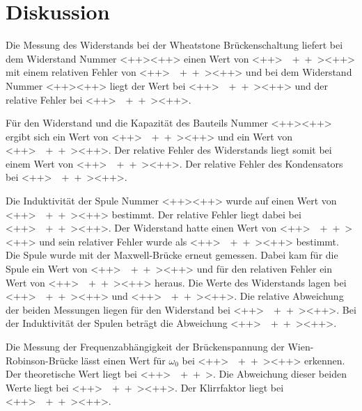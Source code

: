 \section{Diskussion}
\label{sec:Diskussion}

Die Messung des Widerstands bei der Wheatstone Brückenschaltung liefert bei dem Widerstand Nummer \num{<++>}<++> 
einen Wert von \SI{<++>}{\<++>}<++> mit einem relativen Fehler von \SI{<++>}{\<++>}<++> und bei dem Widerstand Nummer 
\num{<++>}<++> liegt der Wert bei \SI{<++>}{\<++>}<++> und der relative Fehler bei \SI{<++>}{\<++>}<++>. 

\noindent Für den Widerstand und die Kapazität des Bauteils Nummer \num{<++>}<++> ergibt sich ein Wert von 
\SI{<++>}{\<++>}<++> und ein Wert von \SI{<++>}{\<++>}<++>. Der relative Fehler des Widerstands liegt somit bei einem 
Wert von \SI{<++>}{\<++>}<++>. Der relative Fehler des Kondensators bei \SI{<++>}{\<++>}<++>. 

\noindent Die Induktivität der Spule Nummer \num{<++>}<++> wurde auf einen Wert von \SI{<++>}{\<++>}<++> bestimmt. 
Der relative Fehler liegt dabei bei \SI{<++>}{\<++>}<++>. Der Widerstand hatte einen Wert von \SI{<++>}{\<++>}<++> 
und sein relativer Fehler wurde als \SI{<++>}{\<++>}<++> bestimmt. 
Die Spule wurde mit der Maxwell-Brücke erneut gemessen. Dabei kam für die Spule ein Wert von \SI{<++>}{\<++>}<++> 
und für den relativen Fehler ein Wert von \SI{<++>}{\<++>}<++> heraus. Die Werte des Widerstands lagen bei 
\SI{<++>}{\<++>}<++> und \SI{<++>}{\<++>}<++>. Die relative Abweichung der beiden Messungen liegen für den Widerstand 
bei \SI{<++>}{\<++>}<++>. Bei der Induktivität der Spulen beträgt die Abweichung \SI{<++>}{\<++>}<++>. 

\noindent Die Messung der Frequenzabhängigkeit der Brückenspannung der Wien-Robinson-Brücke lässt einen Wert für 
$\omega_0$ bei \SI{<++>}{\<++>}<++> erkennen. Der theoretische Wert liegt bei \SI{<++>}{\<++>}. Die Abweichung dieser 
beiden Werte liegt bei \SI{<++>}{\<++>}<++>. Der Klirrfaktor liegt bei \SI{<++>}{\<++>}<++>. 
